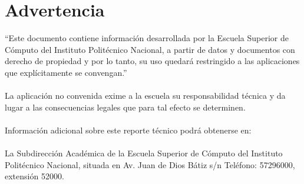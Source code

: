 \chapter*{Advertencia}
\thispagestyle{empty}

“Este documento contiene información desarrollada por la Escuela
Superior de Cómputo del Instituto Politécnico Nacional, a partir de datos y
documentos con derecho de propiedad y por lo tanto, su uso quedará
restringido a las aplicaciones que explícitamente se convengan.”\\
\\
La aplicación no convenida exime a la escuela su responsabilidad técnica y
da lugar a las consecuencias legales que para tal efecto se determinen.\\
\\
Información adicional sobre este reporte técnico podrá obtenerse en:\\
 \\
La Subdirección Académica de la Escuela Superior de Cómputo del Instituto
Politécnico Nacional, situada en Av. Juan de Dios Bátiz s/n Teléfono:
57296000, extensión 52000. 
